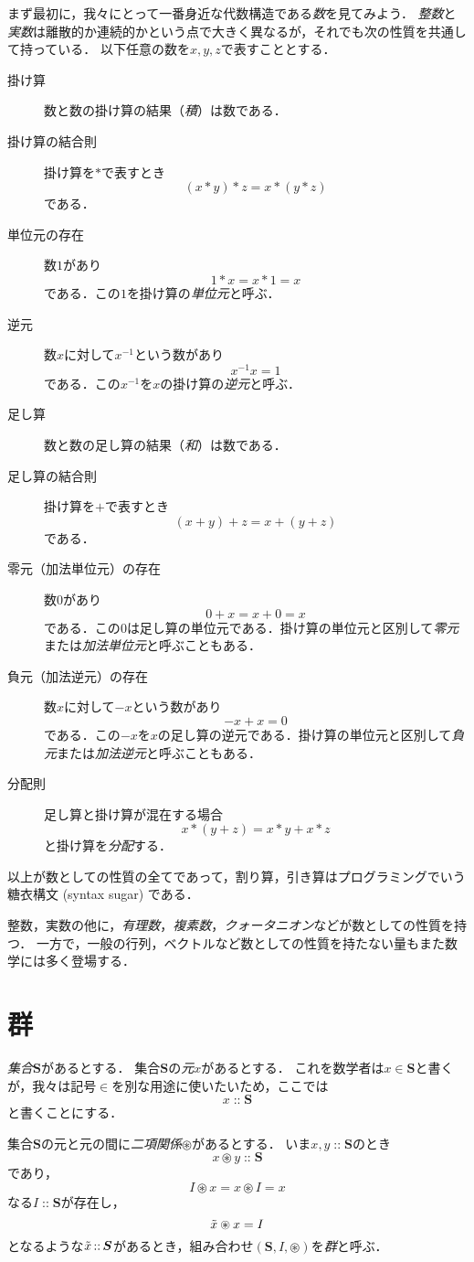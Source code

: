 \documentclass[twocolumn]{jsbook}
\newcommand{\keyword}[1]{\emph{#1}}
\newcommand{\istypeof}{\mathop{::}}
\newcommand{\mathsetname}[1]{\boldsymbol{#1}}
\begin{document}
まず最初に，我々にとって一番身近な代数構造である\keyword{数}を見てみよう．
\keyword{整数}と\keyword{実数}は離散的か連続的かという点で大きく異なるが，それでも次の性質を共通して持っている．
以下任意の数を$x,y,z$で表すこととする．
\begin{description}
\item[掛け算] 数と数の掛け算の結果（\keyword{積}）は数である．
\item[掛け算の結合則] 掛け算を$*$で表すとき$$(x*y)*z=x*(y*z)$$である．
\item[単位元の存在] 数$1$があり$$1*x=x*1=x$$である．この$1$を掛け算の\keyword{単位元}と呼ぶ．
\item[逆元] 数$x$に対して$x^{-1}$という数があり$$x^{-1}x=1$$である．この$x^{-1}$を$x$の掛け算の\keyword{逆元}と呼ぶ．
\item[足し算] 数と数の足し算の結果（\keyword{和}）は数である．
\item[足し算の結合則] 掛け算を$+$で表すとき$$(x+y)+z=x+(y+z)$$である．
\item[零元（加法単位元）の存在] 数$0$があり$$0+x=x+0=x$$である．この$0$は足し算の単位元である．掛け算の単位元と区別して\keyword{零元}または\keyword{加法単位元}と呼ぶこともある．
\item[負元（加法逆元）の存在] 数$x$に対して$-x$という数があり$$-x+x=0$$である．この$-x$を$x$の足し算の逆元である．掛け算の単位元と区別して\keyword{負元}または\keyword{加法逆元}と呼ぶこともある．
\item[分配則] 足し算と掛け算が混在する場合$$x*(y+z)=x*y+x*z$$と掛け算を\keyword{分配}する．
\end{description}
以上が数としての性質の全てであって，割り算，引き算はプログラミングでいう糖衣構文 (syntax sugar) である．

整数，実数の他に，\keyword{有理数}，\keyword{複素数}，\keyword{クォータニオン}などが数としての性質を持つ．
一方で，一般の行列，ベクトルなど数としての性質を持たない量もまた数学には多く登場する．

\section{群}

\keyword{集合}$\mathsetname{S}$があるとする．
集合$\mathsetname{S}$の\keyword{元}$x$があるとする．
これを数学者は$x\in\mathsetname{S}$と書くが，我々は記号$\in$を別な用途に使いたいため，ここでは$$x\istypeof\mathsetname{S}$$と書くことにする．

集合$\mathsetname{S}$の元と元の間に\keyword{二項関係}$\circledast$があるとする．
いま$x,y\istypeof\mathsetname{S}$のとき$$x\circledast y\istypeof\mathsetname{S}$$であり，$$I\circledast x=x\circledast I=x$$なる$I\istypeof\mathsetname{S}$が存在し，$$\Tilde{x}\circledast x=I$$となるような$\Tilde{x}\istypeof\mathsetname{S}$があるとき，組み合わせ$(\mathsetname{S},I,\circledast)$を\keyword{群}と呼ぶ．
\end{document}
